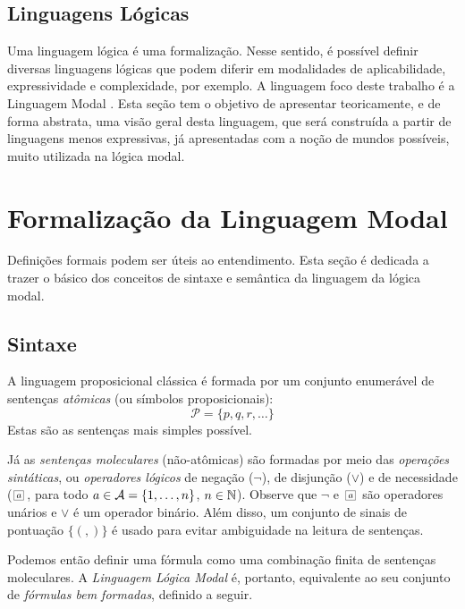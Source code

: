 \subsection{Linguagens Lógicas}
\label{sec:linguagens}
Uma linguagem lógica é uma formalização.  Nesse sentido, é possível definir
diversas linguagens lógicas que podem diferir em modalidades de aplicabilidade,
expressividade e complexidade, por exemplo. A linguagem foco deste trabalho é a
Linguagem Modal . Esta seção tem o objetivo de apresentar
teoricamente, e de forma abstrata, uma visão geral desta linguagem, que será
construída a partir de linguagens menos expressivas, já apresentadas com a noção
de mundos possíveis, muito utilizada na lógica modal.




\section{Formalização da Linguagem Modal }
Definições formais podem ser úteis ao entendimento.
Esta seção é dedicada a trazer o básico dos conceitos de sintaxe e semântica da linguagem da
lógica modal. 

\subsection{Sintaxe}
\label{sec:sintaxe}

A linguagem proposicional clássica é formada por um conjunto enumerável de sentenças
\textit{at\^omicas} (ou símbolos proposicionais): 
\begin{equation}
\label{simb_prop}
    \mathcal{P} = \{p, q, r, \ldots\}
\end{equation}
Estas são as sentenças mais simples possível.

Já as \textit{sentenças moleculares} (não-at\^omicas) são formadas por meio das
\textit{operações sintáticas}, ou \textit{operadores lógicos} de negação
($\neg$), de disjunção ($\vee$)  e de necessidade ($\nec{\agent}$, para todo
$a \in {\cal{A}} = \{1,\ldots, n\}$, $n \in \mbox{$\mathbb N$}$). Observe que $\neg$ e
$\nec{\agent}$ são operadores unários e $\vee$ é um operador binário. Além
disso, um conjunto de sinais de pontuação $\{(,)\}$ é usado para
evitar ambiguidade na leitura de sentenças.

Podemos então definir uma fórmula como uma combinação finita de sentenças
moleculares. A \textit{Linguagem Lógica Modal} é, portanto, equivalente ao seu
conjunto de \textit{fórmulas bem formadas}, definido a seguir.

